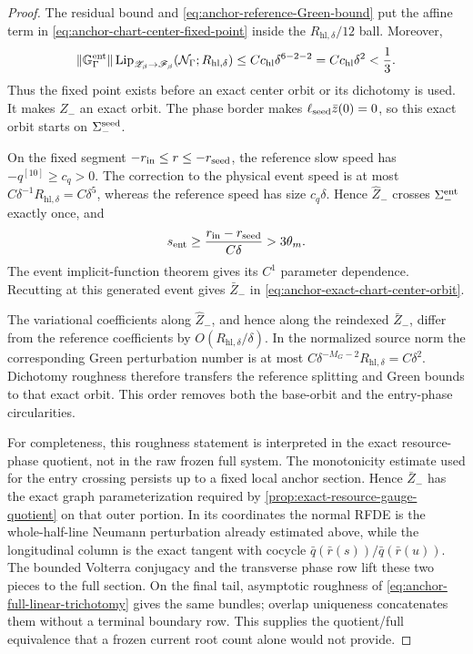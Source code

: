 \begin{proof}
The residual bound and
\cref{eq:anchor-reference-Green-bound} put the affine term in
\cref{eq:anchor-chart-center-fixed-point} inside the
\(R_{\mathrm{hl},\delta}/12\)
ball.  Moreover,
\[
 \|\mathbb G_\Gamma^{\rm ent}\|
 \operatorname{Lip}_{\mathscr Z_\beta\to\mathscr F_\beta}
       (\mathcal N_\Gamma;R_{\mathrm{hl},\delta})
 \le Cc_{\rm hl}\delta^{6-2-2}
 =Cc_{\rm hl}\delta^2<\frac13.
\]
Thus the fixed point exists before an exact center orbit or its dichotomy
is used.  It makes \(\widehat Z_-\) an exact orbit.  The phase border makes
\(\ell_{\rm seed}\bar z(0)=0\), so this exact orbit starts on
\(\Sigma_-^{\rm seed}\).

On the fixed segment
\(-r_{\rm in}\le r\le-r_{\rm seed}\), the reference slow speed has
\(-q^{[10]}\ge c_q>0\).  The correction to the physical event speed is at
most \(C\delta^{-1}R_{\mathrm{hl},\delta}=C\delta^5\), whereas the reference speed has
size \(c_q\delta\).  Hence \(\widehat Z_-\) crosses
\(\Sigma_-^{\rm ent}\) exactly once, and
\[
 s_{\rm ent}\ge\frac{r_{\rm in}-r_{\rm seed}}{C\delta}
       >3\theta_m .
\]
The event implicit-function theorem gives its \(C^1\) parameter
dependence.  Recutting at this generated event gives
\(\bar Z_-\) in \cref{eq:anchor-exact-chart-center-orbit}.

The variational coefficients along \(\widehat Z_-\), and hence along the
reindexed \(\bar Z_-\), differ from the reference coefficients by
\(O(R_{\mathrm{hl},\delta}/\delta)\).  In the normalized source norm the corresponding
Green perturbation number is at most
\(C\delta^{-M_G-2}R_{\mathrm{hl},\delta}=C\delta^2\).  Dichotomy roughness therefore
transfers the reference splitting and Green bounds to that exact orbit.
This order removes both the base-orbit and the entry-phase circularities.

For completeness, this roughness statement is interpreted in the exact
resource-phase quotient, not in the raw frozen full system.  The
monotonicity estimate used for the entry crossing persists up to a fixed
local anchor section.  Hence \(\bar Z_-\) has the exact graph
parameterization required by
\cref{prop:exact-resource-gauge-quotient} on that outer portion.  In its
coordinates the normal RFDE is the whole-half-line Neumann perturbation
already estimated above, while the longitudinal column is the exact
tangent with cocycle
\(\bar q(\bar r(s))/\bar q(\bar r(u))\).  The bounded Volterra conjugacy
and the transverse phase row lift these two pieces to the full section.
On the final tail, asymptotic roughness of
\cref{eq:anchor-full-linear-trichotomy} gives the same bundles; overlap
uniqueness concatenates them without a terminal boundary row.  This
supplies the quotient/full equivalence that a frozen current root count
alone would not provide.


\end{proof}
